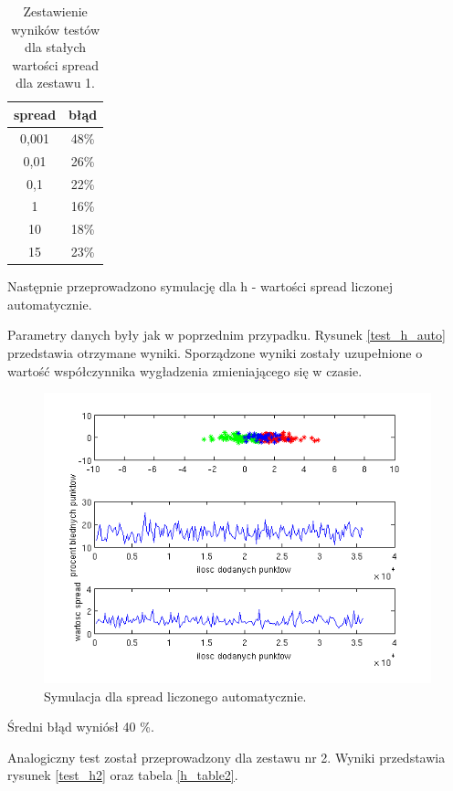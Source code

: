 \documentclass[10pt,a4paper]{article}
\begin{document}
\begin{table}[H]
\centering
\begin{tabular}{|c|c|}
\hline
spread & błąd \\
\hline
0,001 & 48\%  \\
\hline
0,01 & 26\%  \\
\hline
0,1 & 22\%  \\
\hline
1 & 16\%  \\
\hline
10 & 18\%  \\
\hline
15 & 23\%  \\
\hline
\end{tabular}
\caption{Zestawienie wyników testów dla stałych wartości spread dla zestawu 1.}
\label{h_table}
\end{table}


Następnie przeprowadzono symulację dla h - wartości spread liczonej automatycznie. 

Parametry danych były jak w poprzednim przypadku. Rysunek \ref{test_h_auto} przedstawia otrzymane wyniki. Sporządzone wyniki zostały uzupełnione o wartość współczynnika wygładzenia zmieniającego się w czasie. 

\begin{figure}[H]
\centering
\includegraphics[width=15cm]{test_h_auto_16_47.png}
\caption{Symulacja dla spread liczonego automatycznie.}
\label{poj}
\end{figure}

Średni błąd wyniósł 40 \%. 


Analogiczny test został przeprowadzony dla zestawu nr 2. 
Wyniki przedstawia rysunek \ref{test_h2} oraz tabela \ref{h_table2}.
\end{document}

